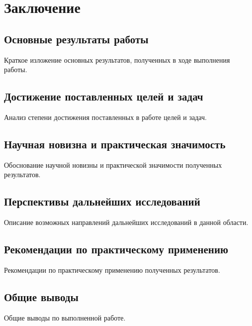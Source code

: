 \chapter{Заключение}

\section{Основные результаты работы}

Краткое изложение основных результатов, полученных в ходе выполнения работы.

\section{Достижение поставленных целей и задач}

Анализ степени достижения поставленных в работе целей и задач.

\section{Научная новизна и практическая значимость}

Обоснование научной новизны и практической значимости полученных результатов.

\section{Перспективы дальнейших исследований}

Описание возможных направлений дальнейших исследований в данной области.

\section{Рекомендации по практическому применению}

Рекомендации по практическому применению полученных результатов.

\section{Общие выводы}

Общие выводы по выполненной работе.
